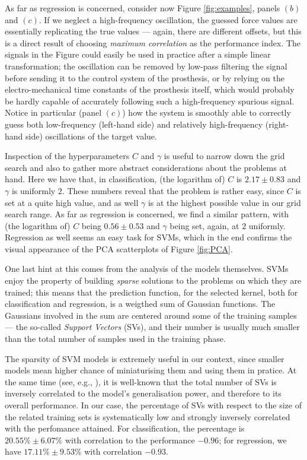 As far as regression is concerned, consider now Figure
\ref{fig:examples}, panels $(b)$ and $(c)$. If we neglect a
high-frequency oscillation, the guessed force values are essentially
replicating the true values --- again, there are different offsets,
but this is a direct result of choosing \emph{maximum correlation} as
the performance index. The signals in the Figure could easily be used
in practice after a simple linear transformation; the oscillation can
be removed by low-pass filtering the signal before sending it to the
control system of the prosthesis, or by relying on the
electro-mechanical time constants of the prosthesis itself, which
would probably be hardly capable of accurately following such a
high-frequency spurious signal. Notice in particular (panel $(c)$) how
the system is smoothly able to correctly guess both low-frequency
(left-hand side) and relatively high-frequency (right-hand side)
oscillations of the target value.

Inspection of the hyperparameters $C$ and $\gamma$ is useful to narrow
down the grid search and also to gather more abstract considerations
about the problems at hand. Here we have that, in classification, (the
logarithm of) $C$ is $2.17 \pm 0.83$ and $\gamma$ is uniformly
$2$. These numbers reveal that the problem is rather easy, since $C$
is set at a quite high value, and as well $\gamma$ is at the highest
possible value in our grid search range. As far as regression is
concerned, we find a similar pattern, with (the logarithm of) $C$
being $0.56 \pm 0.53$ and $\gamma$ being set, again, at $2$
uniformly. Regression as well seems an easy task for SVMs, which in
the end confirms the visual appearance of the PCA scatterplots of
Figure \ref{fig:PCA}.

One last hint at this comes from the analysis of the models
themselves. SVMs enjoy the property of building \emph{sparse}
solutions to the problems on which they are trained; this means that
the prediction function, for the selected kernel, both for
classification and regression, is a weigthed sum of Gaussian
functions. The Gaussians involved in the sum are centered around some
of the training samples --- the so-called \emph{Support Vectors}
(SVs), and their number is usually much smaller than the total number
of samples used in the training phase.

The sparsity of SVM models is extremely useful in our context, since
smaller models mean higher chance of miniaturising them and using them
in pratice. At the same time (see, e.g., \cite{v-edbed-82}), it is
well-known that the total number of SVs is inversely correlated to the
model's generalisation power, and therefore to its overall
performance. In our case, the percentage of SVs with respect to the
size of the related training sets is systematically low and strongly
inversely correlated with the perfomance attained. For classification,
the percentage is $20.55\% \pm 6.07\%$ with correlation to the
performance $-0.96$; for regression, we have $17.11\% \pm 9.53\%$ with
correlation $-0.93$.

